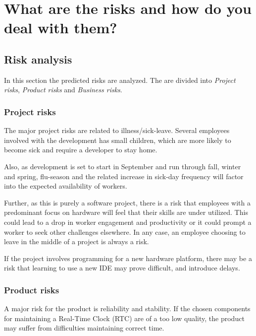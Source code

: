 \documentclass[Main]{subfiles}
\begin{document}
\section{What are the risks and how do you deal with them?}

	\subsection{Risk analysis} %
	\label{sub:risk_analysis}

	In this section the predicted risks are analyzed.
	The are divided into \emph{Project risks}, \emph{Product risks} and \emph{Business risks}.

	\vspace{-5mm}

		\subsubsection{Project risks} %
		\label{sub:project_risks}

		The major project risks are related to illness/sick-leave.
		Several employees involved with the development has small children, which are more likely to become sick and require a developer to stay home.

		Also, as development is set to start in September and run through fall, winter and spring, flu-season and the related increase in sick-day frequency will factor into the expected availability of workers.

		Further, as this is purely a software project, there is a risk that employees with a predominant focus on hardware will feel that their skills are under utilized. 
		This could lead to a drop in worker engagement and productivity or it could prompt a worker to seek other challenges elsewhere.
		In any case, an employee choosing to leave in the middle of a project is always a risk.

		If the project involves programming for a new hardware platform, there may be a risk that learning to use a new IDE may prove difficult, and introduce delays.


		\subsubsection{Product risks} %
		\label{sub:product_risks}

		A major risk for the product is reliability and stability.
		If the chosen components for maintaining a Real-Time Clock (RTC) are of a too low quality, the product may suffer from difficulties maintaining correct time.
\end{document}
